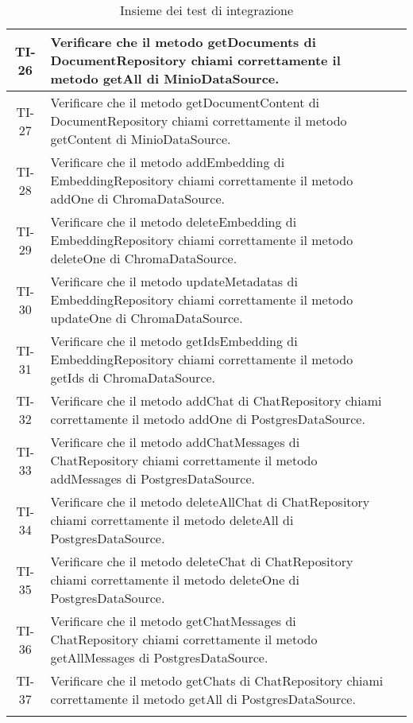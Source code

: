 \begin{xltabular}{\textwidth}{| c | X | c |}
    \hline
    TI-26 & Verificare che il metodo getDocuments di DocumentRepository chiami correttamente il metodo getAll di MinioDataSource. & \textcolor{cmarkcolor}{} \\
    \hline
    TI-27 & Verificare che il metodo getDocumentContent di DocumentRepository chiami correttamente il metodo getContent di MinioDataSource. & \textcolor{cmarkcolor}{} \\
    \hline
    TI-28 & Verificare che il metodo addEmbedding di EmbeddingRepository  chiami correttamente il metodo addOne di ChromaDataSource. & \textcolor{cmarkcolor}{} \\
    \hline
    TI-29 & Verificare che il metodo deleteEmbedding di EmbeddingRepository  chiami correttamente il metodo deleteOne di ChromaDataSource. & \textcolor{cmarkcolor}{} \\
    \hline
    TI-30 & Verificare che il metodo updateMetadatas di EmbeddingRepository  chiami correttamente il metodo updateOne di ChromaDataSource. & \textcolor{cmarkcolor}{} \\
    \hline
    TI-31 & Verificare che il metodo getIdsEmbedding di EmbeddingRepository  chiami correttamente il metodo getIds di ChromaDataSource. & \textcolor{cmarkcolor}{} \\
    \hline
    TI-32 & Verificare che il metodo addChat di ChatRepository  chiami correttamente il metodo addOne di PostgresDataSource. & \textcolor{cmarkcolor}{} \\
    \hline
    TI-33 & Verificare che il metodo addChatMessages di ChatRepository  chiami correttamente il metodo addMessages di PostgresDataSource. & \textcolor{cmarkcolor}{} \\
    \hline
    TI-34 & Verificare che il metodo deleteAllChat di ChatRepository  chiami correttamente il metodo deleteAll di PostgresDataSource. & \textcolor{cmarkcolor}{} \\
    \hline
    TI-35 & Verificare che il metodo deleteChat di ChatRepository  chiami correttamente il metodo deleteOne di PostgresDataSource. & \textcolor{cmarkcolor}{} \\
    \hline
    TI-36 & Verificare che il metodo getChatMessages di ChatRepository  chiami correttamente il metodo getAllMessages di PostgresDataSource. & \textcolor{cmarkcolor}{} \\
    \hline
    TI-37 & Verificare che il metodo getChats di ChatRepository  chiami correttamente il metodo getAll di PostgresDataSource. & \textcolor{cmarkcolor}{} \\
    \hline
     \caption{Insieme dei test di integrazione}
    \label{tab:testinter}
\end{xltabular}

